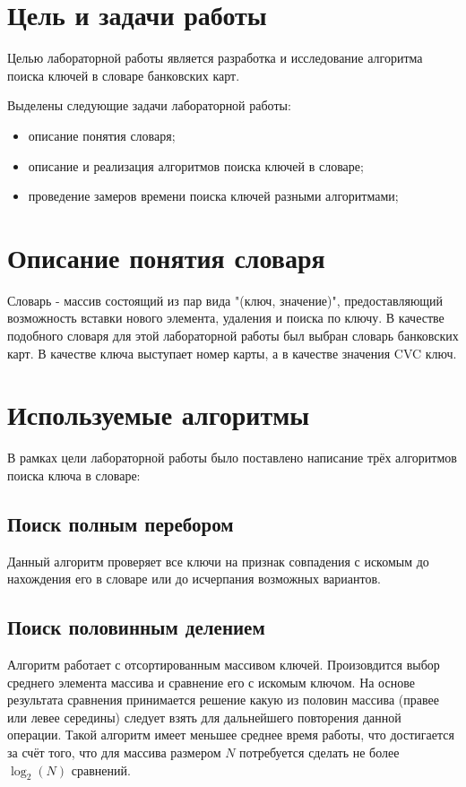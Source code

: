 \section{Цель и задачи работы}
Целью лабораторной работы является разработка и исследование алгоритма поиска ключей в словаре банковских карт.

Выделены следующие задачи лабораторной работы:

\begin{itemize}
\item описание понятия словаря;
\item описание и реализация алгоритмов поиска ключей в словаре;
\item проведение замеров времени поиска ключей разными алгоритмами;
\end{itemize}

\section{Описание понятия словаря}
Словарь - массив состоящий из пар вида "(ключ, значение)", предоставляющий возможность вставки нового элемента, удаления и поиска по ключу\cite{Corman}. В качестве подобного словаря для этой лабораторной работы был выбран словарь банковских карт. В качестве ключа выступает номер карты, а в качестве значения CVC ключ.


\section{Используемые алгоритмы}
В рамках цели лабораторной работы было поставлено написание трёх алгоритмов поиска ключа в словаре:

\subsection{Поиск полным перебором}
	Данный алгоритм проверяет все ключи на признак совпадения с искомым до нахождения его в словаре или до исчерпания возможных вариантов.

\subsection{Поиск половинным делением}
	Алгоритм работает с отсортированным массивом ключей. Произовдится выбор среднего элемента массива и сравнение его с искомым ключом. На основе результата сравнения принимается решение какую из половин массива (правее или левее середины) следует взять для дальнейшего повторения данной операции. Такой алгоритм имеет меньшее среднее время работы, что достигается за счёт того, что для массива размером $N$ потребуется сделать не более $\log_{2}(N)$ сравнений.
	
